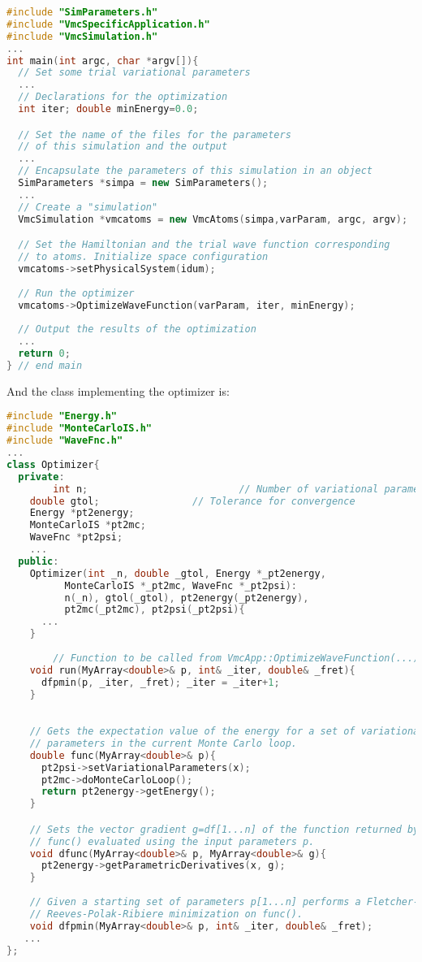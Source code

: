 \begin{lstlisting}[language=c++]
#include "SimParameters.h"
#include "VmcSpecificApplication.h"
#include "VmcSimulation.h"
...
int main(int argc, char *argv[]){
  // Set some trial variational parameters
  ...
  // Declarations for the optimization
  int iter; double minEnergy=0.0;

  // Set the name of the files for the parameters 
  // of this simulation and the output
  ...
  // Encapsulate the parameters of this simulation in an object
  SimParameters *simpa = new SimParameters();
  ...
  // Create a "simulation" 
  VmcSimulation *vmcatoms = new VmcAtoms(simpa,varParam, argc, argv);

  // Set the Hamiltonian and the trial wave function corresponding
  // to atoms. Initialize space configuration
  vmcatoms->setPhysicalSystem(idum);
	
  // Run the optimizer
  vmcatoms->OptimizeWaveFunction(varParam, iter, minEnergy);
  
  // Output the results of the optimization
  ...
  return 0;
} // end main
\end{lstlisting}
And the class implementing the optimizer is:
\begin{lstlisting}[language=c++]
#include "Energy.h"
#include "MonteCarloIS.h"
#include "WaveFnc.h"
...
class Optimizer{
  private:
		int n;  		   				// Number of variational parameters
    double gtol;	   			// Tolerance for convergence
    Energy *pt2energy;
    MonteCarloIS *pt2mc;
    WaveFnc *pt2psi;
    ...
  public:
    Optimizer(int _n, double _gtol, Energy *_pt2energy, 
	      MonteCarloIS *_pt2mc, WaveFnc *_pt2psi):
	      n(_n), gtol(_gtol), pt2energy(_pt2energy), 
	      pt2mc(_pt2mc), pt2psi(_pt2psi){
      ...
    } 
		
		// Function to be called from VmcApp::OptimizeWaveFunction(...).
    void run(MyArray<double>& p, int& _iter, double& _fret){
      dfpmin(p, _iter, _fret); _iter = _iter+1;
    }
\end{lstlisting}

\begin{lstlisting}[language=c++]

    // Gets the expectation value of the energy for a set of variational 
    // parameters in the current Monte Carlo loop. 
    double func(MyArray<double>& p){
      pt2psi->setVariationalParameters(x);
      pt2mc->doMonteCarloLoop();
      return pt2energy->getEnergy();
    }

    // Sets the vector gradient g=df[1...n] of the function returned by 
    // func() evaluated using the input parameters p.
    void dfunc(MyArray<double>& p, MyArray<double>& g){
      pt2energy->getParametricDerivatives(x, g); 
    }
    
    // Given a starting set of parameters p[1...n] performs a Fletcher-
    // Reeves-Polak-Ribiere minimization on func(). 
    void dfpmin(MyArray<double>& p, int& _iter, double& _fret); 	
   ...   
};
\end{lstlisting}

